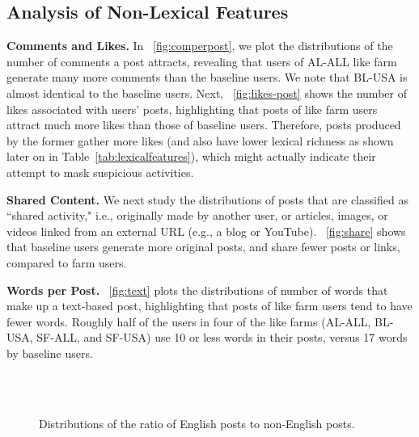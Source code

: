 \documentclass[twocolumn,10pt,letterpaper]{article}
\newcommand{\descr}[1]{\smallskip\noindent\textbf{#1}}
\begin{document}
\subsection{Analysis of Non-Lexical Features}
\label{sec:charNL}


\descr{Comments and Likes.} In \figurename~\ref{fig:comperpost}, we plot the distributions of the number of comments a post attracts, revealing that users of AL-ALL like farm generate many more comments than the baseline users. We note that BL-USA is almost identical to the baseline users. Next, \figurename~\ref{fig:likes-post} shows the number of likes associated with users' posts, highlighting that posts of like farm users attract much more likes than those of baseline users. Therefore, posts produced by the former gather more likes (and also have lower lexical richness as shown later on in Table~\ref{tab:lexicalfeatures}), which might actually indicate their attempt to mask suspicious activities.


\descr{Shared Content.} We next study the distributions of posts that are classified as ``shared activity," i.e.,  originally made by another user, or articles, images, or videos linked from an external URL (e.g., a blog or YouTube). \figurename~\ref{fig:share} shows that baseline users generate more original posts, and share fewer posts or links, compared to farm users.

\descr{Words per Post.}
\figurename~\ref{fig:text} plots the distributions of number of words that make up a text-based post, highlighting that posts of like farm users tend to have fewer words. Roughly half of the users in four of the like farms (AL-ALL, BL-USA, SF-ALL, and SF-USA) use 10 or less words in their posts, versus 17 words by baseline users.


%
\begin{figure*}[t]
	\centering
	\hspace{-0.5cm}
	~
	\\
	\hspace{-0.5cm}
	~
\vspace{-0.15cm}	
	\caption{Distributions of the ratio of English posts to non-English posts.}%
	\label{fig:lang_ratio}
\end{figure*}
\end{document}
